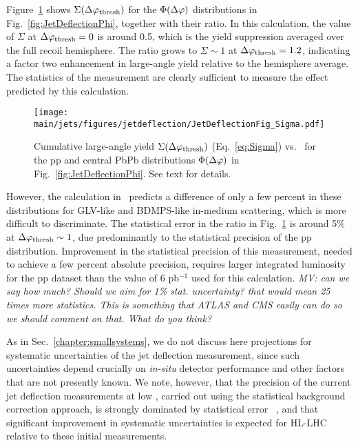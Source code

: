 \noindent
Figure~\ref{fig:JetDeflectionSigma} shows $\Sigma(\Delta\varphi_{\mathrm{thresh}})$ for the $\Phi(\Delta\varphi)$ distributions in Fig.~\ref{fig:JetDeflectionPhi}, together with their ratio. In this calculation, the value of $\Sigma$ at $\Delta\varphi_{\mathrm{thresh}}=0$ is around 0.5, which is the yield suppression averaged over the full recoil hemisphere. The ratio grows to $\Sigma\sim1$ at $\Delta\varphi_{\mathrm{thresh}}=1.2$, indicating a factor two enhancement in large-angle yield relative to the hemisphere average. The statistics of the measurement are clearly sufficient to measure the effect predicted by this calculation.
\begin{figure}[tbh!]
\centering
\texttt{[image: \\main/jets/figures/jetdeflection/JetDeflectionFig\_Sigma.pdf]}
\caption{Cumulative large-angle yield $\Sigma(\Delta\varphi_{\mathrm{thresh}})$ (Eq.~\ref{eq:Sigma}) vs. \dphithresh\ for the pp and central PbPb distributions $\Phi(\Delta\varphi)$ in Fig.~\ref{fig:JetDeflectionPhi}. See text for details. 
}
\label{fig:JetDeflectionSigma}
\end{figure}
However, the calculation in~\cite{Gyulassy:2018qhr} predicts a difference of only a few percent in these distributions for GLV-like and BDMPS-like in-medium scattering, which is more difficult to discriminate. The statistical error in the ratio in Fig.~\ref{fig:JetDeflectionSigma} is around 5\% at $\Delta\varphi_{\mathrm{thresh}}\sim1$, due predominantly to the statistical precision of the pp distribution. Improvement in the statistical precision of this measurement, needed to achieve a few percent absolute precision, requires larger integrated luminosity for the pp dataset than the value of 6 pb$^{-1}$ used for this calculation. {\it \color{blue} MV: can we say how much? Should we aim for 1\% stat. uncertainty? that would mean 25 times more statistics. This is something that ATLAS and CMS easily can do so we should comment on that. What do you think?\color{black}}

As in Sec.~\ref{chapter:smallsystems}, we do not discuss here projections for systematic uncertainties of the jet deflection measurement, since such uncertainties depend crucially on {\it in-situ} detector performance and other factors that are not presently known. We note, however, that the precision of the current jet deflection measurements at low \ptjetch, carried out using the statistical background correction approach, is strongly dominated by statistical error ~\cite{Adam:2015doa,Adamczyk:2017yhe}, and that significant improvement in systematic uncertainties is expected for HL-LHC relative to these initial measurements.  


